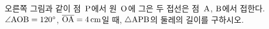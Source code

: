 \noindent\begin{minipage}[t]{0.58\linewidth}\vspace{0pt}\raggedright 오른쪽 그림과 같이 점~$\mathrm{P}$에서 원~$\mathrm{O}$에 그은 두 접선은 점~$\mathrm{A}$, $\mathrm{B}$에서 접한다. $\angle\mathrm{AOB}=120^\circ$, $\overline{\mathrm{OA}}=4\,\mathrm{cm}$일 때, $\triangle\mathrm{APB}$의 둘레의 길이를 구하시오.\end{minipage}\hfill\begin{minipage}[t]{0.4\linewidth}\vspace{0pt}\centering \resizebox{\ifdim\width>\linewidth\linewidth\else\width\fi}{!}{}\end{minipage}\par
